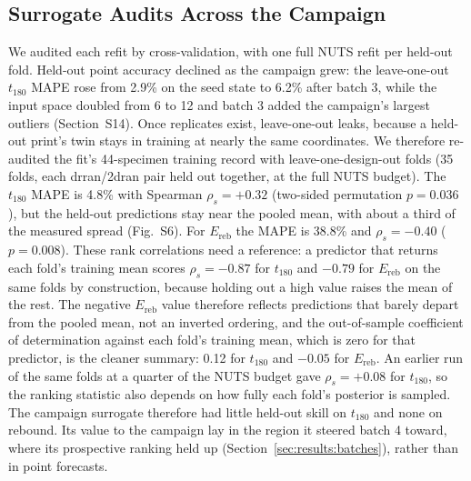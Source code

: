 \documentclass[11pt]{article}
\begin{document}
\subsection{Surrogate Audits Across the Campaign}
\label{sec:results:audits}

We audited each refit by cross-validation, with one full NUTS refit per
held-out fold. Held-out point accuracy declined as the campaign grew:
the leave-one-out $t_{180}$ MAPE rose from 2.9\% on the seed state to
6.2\% after batch 3, while the input space doubled from 6 to 12 and
batch 3 added the campaign's largest outliers
(Section~S14). Once replicates exist, leave-one-out
leaks, because a held-out print's twin stays in training at nearly the
same coordinates. We therefore re-audited the fit's 44-specimen
training record with leave-one-design-out folds (35 folds, each
drran/2dran pair held out together, at the full NUTS budget). The
$t_{180}$ MAPE is 4.8\% with Spearman $\rho_s = +0.32$ (two-sided
permutation $p = 0.036$), but the held-out predictions stay near the
pooled mean, with about a third of the measured spread
(Fig.~S6). For $E_{\mathrm{reb}}$ the MAPE is 38.8\%
and $\rho_s = -0.40$ ($p = 0.008$). These rank correlations need a
reference: a predictor that returns each fold's training mean scores
$\rho_s = -0.87$ for $t_{180}$ and $-0.79$ for $E_{\mathrm{reb}}$ on the
same folds by construction, because holding out a high value raises the
mean of the rest. The negative $E_{\mathrm{reb}}$ value therefore
reflects predictions that barely depart from the pooled mean, not an
inverted ordering, and the out-of-sample coefficient of determination
against each fold's training mean, which is zero for that predictor, is
the cleaner summary: 0.12 for $t_{180}$ and $-0.05$ for
$E_{\mathrm{reb}}$. An earlier run of the same folds at a quarter of the
NUTS budget gave $\rho_s = +0.08$ for $t_{180}$, so the ranking statistic
also depends on how fully each fold's posterior is sampled. The campaign
surrogate therefore had little held-out skill on $t_{180}$ and none on
rebound. Its value to the campaign lay in
the region it steered batch 4 toward, where its prospective ranking held
up (Section~\ref{sec:results:batches}), rather than in point forecasts.
\end{document}
